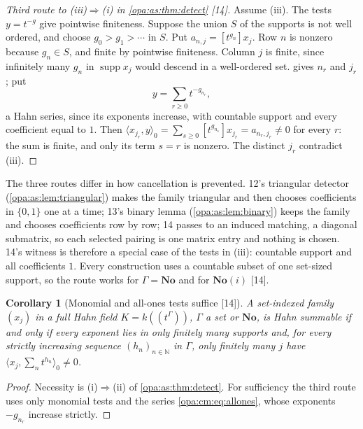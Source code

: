 \documentclass[11pt,oneside]{article}
\numberwithin{equation}{section}
\newtheorem{corollary}[corollary]{Corollary}
\theoremstyle{definition}
\theoremstyle{remark}
\newcommand{\No}{\mathbf{No}}
\newcommand{\SC}{\mathbf{No}(i)}
\newcommand{\N}{\mathbb N}
\newcommand{\supp}{\operatorname{supp}}
\newcommand{\Hahn}[2]{#1((t^{#2}))}
\newcommand{\coef}[2]{[t^{#1}]#2}
\newcommand{\src}[1]{\textup{\textsf{\small[#1]}}}
\newcommand{\pairing}[2]{\langle #1,#2\rangle_0}
\begin{document}
\begin{proof}[Third route to \textup{(iii)$\Rightarrow$(i)} in \cref{opa:as:thm:detect} \src{14}]
Assume (iii). The tests $y=t^{-g}$ give pointwise finiteness. Suppose the union $S$ of the
supports is not well ordered, and choose $g_0>g_1>\cdots$ in $S$. Put
$a_{n,j}=\coef{g_n}{x_j}$. Row $n$ is nonzero because $g_n\in S$, and finite by pointwise
finiteness. Column $j$ is finite, since infinitely many $g_n$ in $\supp x_j$ would descend in
a well-ordered set.  gives $n_r$ and $j_r$; put
\begin{equation}\label{opa:cm:eq:allones}
 y=\sum_{r\ge0}t^{-g_{n_r}} ,
\end{equation}
a Hahn series, since its exponents increase, with countable support and every coefficient
equal to $1$. Then $\pairing{x_{j_r}}y=\sum_{s\ge0}\coef{g_{n_s}}{x_{j_r}}=a_{n_r,j_r}\ne0$ for every
$r$: the sum is finite, and only its term $s=r$ is nonzero. The distinct $j_r$ contradict
(iii).
\end{proof}

The three routes differ in how cancellation is prevented. 12's triangular detector
(\cref{opa:as:lem:triangular}) makes the family triangular and then chooses coefficients in
$\{0,1\}$ one at a time; 13's binary lemma (\cref{opa:as:lem:binary}) keeps the family and
chooses coefficients row by row; 14 passes to an induced matching, a diagonal submatrix, so
each selected pairing is one matrix entry and nothing is chosen. 14's witness is therefore a
special case of the tests in (iii): countable support and all coefficients $1$. Every
construction uses a countable subset of one set-sized support, so the route works for
$\Gamma=\No$ and for $\SC$ \src{14}.

\begin{corollary}[Monomial and all-ones tests suffice \src{14}]\label{opa:cm:cor:allones}
A set-indexed family $(x_j)$ in a full Hahn field $K=\Hahn k\Gamma$, $\Gamma$ a set or $\No$, is
Hahn summable if and only if every exponent lies in only finitely many supports and, for
every strictly increasing sequence $(h_n)_{n\in\N}$ in $\Gamma$, only finitely many $j$ have
$\pairing{x_j}{\sum_nt^{h_n}}\ne0$.
\end{corollary}
\begin{proof}
Necessity is (i)$\Rightarrow$(ii) of \cref{opa:as:thm:detect}. For sufficiency the third route
uses only monomial tests and the series \eqref{opa:cm:eq:allones}, whose exponents
$-g_{n_r}$ increase strictly.
\end{proof}
\end{document}
